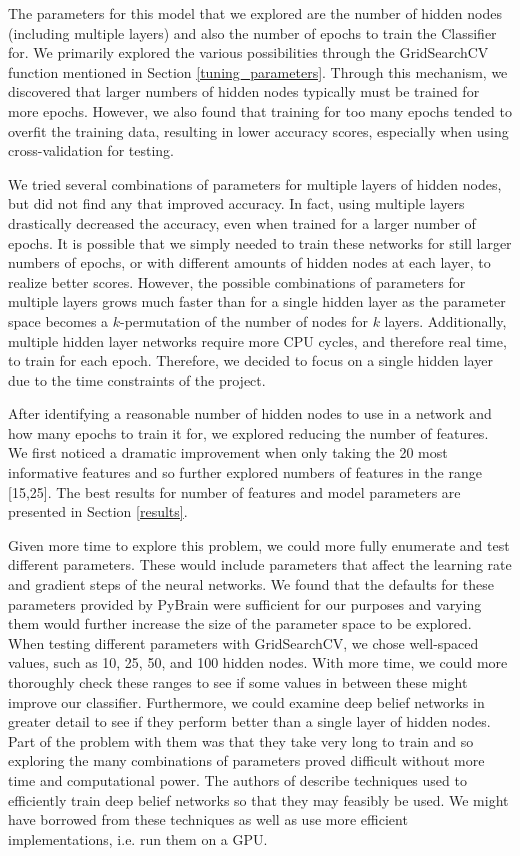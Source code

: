 \documentclass{article}
\begin{document}
The parameters for this model that we explored are the number of hidden nodes (including multiple layers) and also the number of epochs to train the Classifier for.
We primarily explored the various possibilities through the GridSearchCV function mentioned in Section \ref{tuning_parameters}.
Through this mechanism, we discovered that larger numbers of hidden nodes typically must be trained for more epochs.
However, we also found that training for too many epochs tended to overfit the training data, resulting in lower accuracy scores, especially when using cross-validation for testing.

We tried several combinations of parameters for multiple layers of hidden nodes, but did not find any that improved accuracy.
In fact, using multiple layers drastically decreased the accuracy, even when trained for a larger number of epochs.
It is possible that we simply needed to train these networks for still larger numbers of epochs, or with different amounts of hidden nodes at each layer, to realize better scores.
However, the possible combinations of parameters for multiple layers grows much faster than for a single hidden layer as the parameter space becomes a $k$-permutation of the number of nodes for $k$ layers.
Additionally, multiple hidden layer networks require more CPU cycles, and therefore real time, to train for each epoch.
Therefore, we decided to focus on a single hidden layer due to the time constraints of the project.

After identifying a reasonable number of hidden nodes to use in a network and how many epochs to train it for, we explored reducing the number of features.
We first noticed a dramatic improvement when only taking the 20 most informative features and so further explored numbers of features in the range [15,25].
The best results for number of features and model parameters are presented in Section \ref{results}.

Given more time to explore this problem, we could more fully enumerate and test different parameters.
These would include parameters that affect the learning rate and gradient steps of the neural networks.
We found that the defaults for these parameters provided by PyBrain were sufficient for our purposes and varying them would further increase the size of the parameter space to be explored.
When testing different parameters with GridSearchCV, we chose well-spaced values, such as 10, 25, 50, and 100 hidden nodes.
With more time, we could more thoroughly check these ranges to see if some values in between these might improve our classifier.
Furthermore, we could examine deep belief networks in greater detail to see if they perform better than a single layer of hidden nodes.
Part of the problem with them was that they take very long to train and so exploring the many combinations of parameters proved difficult without more time and computational power.
The authors of \cite{deep_belief} describe techniques used to efficiently train deep belief networks so that they may feasibly be used.
We might have borrowed from these techniques as well as use more efficient implementations, i.e. run them on a GPU.
\end{document}
